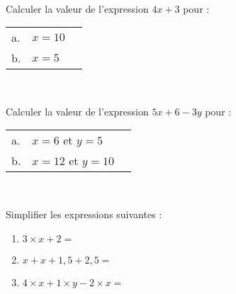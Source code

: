 \documentclass[a4paper,12pt,landscape,twocolumn]{article}
\begin{document}
{	\begin{exercice}\

		Calculer la valeur de l'expression $4x + 3$ pour : \vspace{0.5em}

		\begin{tabular}{llm{4cm}}
			a. & $x = 10$ & \dotfill \\ %
			b. & $x = 5$  & \dotfill \\ %
		\end{tabular}
	\end{exercice}

	\begin{exercice}\

		Calculer la valeur de l'expression $5x + 6 - 3y$ pour : \vspace{0.5em}

		\begin{tabular}{llm{4cm}}
			a. & $x = 6$ et $y = 5$   & \dotfill \\ %
			b. & $x = 12$ et $y = 10$ & \dotfill \\ %
		\end{tabular}
	\end{exercice}

	\begin{exercice}\

		Simplifier les expressions suivantes : \vspace{0.5em}
		\begin{enumerate}[label=\alph*.]
			\setlength\itemsep{5pt}
			\item $3 × x + 2 = $ \dotfill
			\item $x + x + 1{,}5 + 2{,}5 = $ \dotfill
			\item $4 × x + 1 × y  - 2 × x = $ \dotfill
		\end{enumerate}
	\end{exercice}
}

\newpage

\setcounter{exercice}{0}
\end{document}
